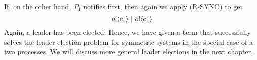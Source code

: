 If, on the other hand, $P_1$ notifies first, then again we apply (R-SYNC) to get
\[
	{o}!\langle{c_1}\rangle \ |\  {o}!\langle{c_1}\rangle
\]
Again, a leader has been elected.
Hence, we have given a term that successfully solves the leader election problem for symmetric systems in the special case of a two processes.  We will discuss more general leader elections in the next chapter.